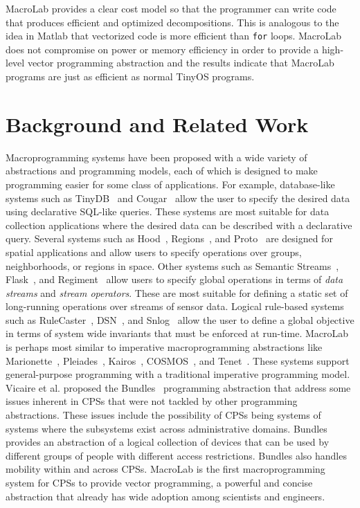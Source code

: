 MacroLab provides a clear cost model so that the programmer can write
code that produces efficient and optimized decompositions.  This is
analogous to the idea in Matlab that vectorized code is more efficient
than {\tt for} loops.  MacroLab does not compromise on power or memory
efficiency in order to provide a high-level vector programming
abstraction and the results indicate that MacroLab programs are just
as efficient as normal TinyOS programs.

\section{Background and Related Work} \label{sect:relatedwork}

Macroprogramming systems have been proposed with a wide variety of abstractions
and programming models, each of which is designed to make programming easier for
some class of applications.  For example, database-like systems such as
TinyDB~\cite{Madden} and Cougar~\cite{Yao} allow the user to specify the desired
data using declarative SQL-like queries.  These systems are most suitable for
data collection applications where the desired data can be described with a
declarative query.  Several systems such as Hood~\cite{Whitehousea},
Regions~\cite{Welsh2004}, and Proto~\cite{Bachrach} are designed for spatial
applications and allow users to specify operations over groups, neighborhoods,
or regions in space.  Other systems such as Semantic Streams~\cite{Whitehouse},
Flask~\cite{Mainland}, and Regiment~\cite{Newton} allow users to specify global
operations in terms of {\em data streams} and {\em stream operators}.  These are
most suitable for defining a static set of long-running operations over streams
of sensor data. Logical rule-based systems such as RuleCaster~\cite{Bischoff},
DSN~\cite{Chu2006}, and Snlog~\cite{Chu2007} allow the user to define a global
objective in terms of system wide invariants that must be enforced at run-time.
MacroLab is perhaps most similar to imperative macroprogramming abstractions
like Marionette~\cite{Whitehouseb}, Pleiades~\cite{Kothari},
Kairos~\cite{Gummadi}, COSMOS~\cite{Awan}, and Tenet~\cite{Gnawali}.  These
systems support general-purpose programming with a traditional imperative
programming model. Vicaire et al. proposed the Bundles~\cite{vicaire2010bundle}
programming abstraction that address some issues inherent in CPSs that were not
tackled by other programming abstractions. These issues include the possibility
of CPSs being systems of systems where the subsystems exist across
administrative domains. Bundles provides an abstraction of a logical collection
of devices that can be used by different groups of people with different access
restrictions. Bundles also handles mobility within and across CPSs. MacroLab is
the first macroprogramming system for CPSs to provide vector programming, a
powerful and concise abstraction that already has wide adoption among scientists
and engineers.

